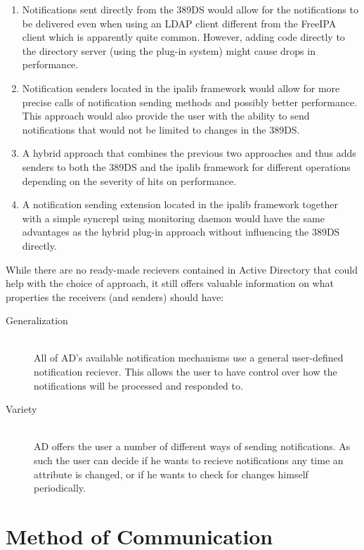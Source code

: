 \begin{enumerate}
    \item Notifications sent directly from the 389DS would allow for the notifications to be delivered even when using an LDAP client different from the FreeIPA client which is apparently quite common.
    However, adding code directly to the directory server (using the plug-in system) might cause drops in performance.
    \item Notification senders located in the ipalib framework would allow for more precise calls of notification sending methods and possibly better performance.
    This approach would also provide the user with the ability to send notifications that would not be limited to changes in the 389DS.
    \item A hybrid approach that combines the previous two approaches and thus adds senders to both the 389DS and the ipalib framework for different operations depending on the severity of hits on performance.
    \item A notification sending extension located in the ipalib framework together with a simple syncrepl using monitoring daemon would have the same advantages as the hybrid plug-in approach without influencing
    the 389DS directly.
\end{enumerate}
\clearpage

While there are no ready-made recievers contained in Active Directory that could help with the choice of approach, it still offers valuable information on what properties the receivers (and senders) should have:

\begin{description}
    \item[Generalization]\hfill \\
        All of AD's available notification mechanisms use a general user-defined notification reciever.
        This allows the user to have control over how the notifications will be processed and responded to.
    \item[Variety]\hfill \\
        AD offers the user a number of different ways of sending notifications. As such the user can decide if he wants to recieve notifications any time an attribute is changed,
        or if he wants to check for changes himself periodically.
\end{description}



\section{Method of Communication}


